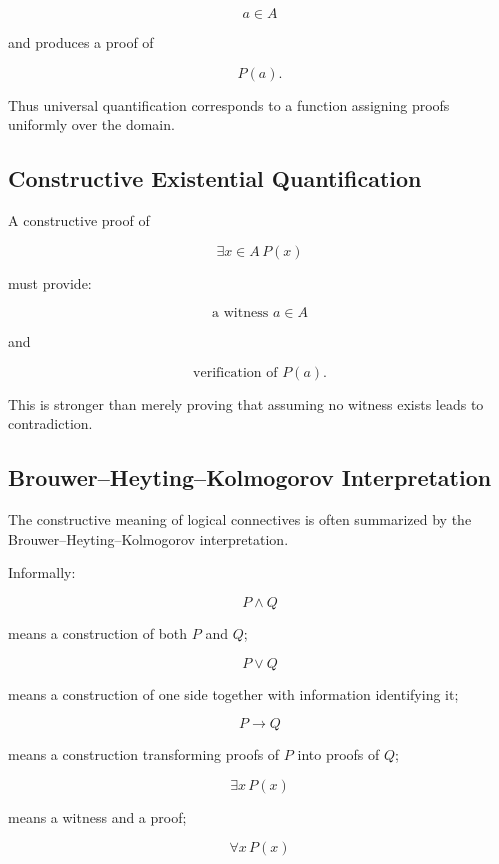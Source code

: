 \[
a\in A
\]

and produces a proof of

\[
\boxed{
P(a).
}
\]

Thus universal quantification corresponds to a function assigning proofs
uniformly over the domain.

\subsection{Constructive Existential Quantification}
\label{subsec:constructive-existential}

A constructive proof of

\[
\exists x\in A\,P(x)
\]

must provide:

\[
\boxed{
\text{a witness }a\in A
}
\]

and

\[
\boxed{
\text{verification of }P(a).
}
\]

This is stronger than merely proving that assuming no witness exists leads
to contradiction.

\subsection{Brouwer--Heyting--Kolmogorov Interpretation}
\label{subsec:bhk-interpretation}

The constructive meaning of logical connectives is often summarized by the
Brouwer--Heyting--Kolmogorov interpretation.

Informally:

\[
\boxed{
P\land Q
}
\]

means a construction of both \(P\) and \(Q\);

\[
\boxed{
P\lor Q
}
\]

means a construction of one side together with information identifying it;

\[
\boxed{
P\rightarrow Q
}
\]

means a construction transforming proofs of \(P\) into proofs of \(Q\);

\[
\boxed{
\exists x\,P(x)
}
\]

means a witness and a proof;

\[
\boxed{
\forall x\,P(x)
}
\]

